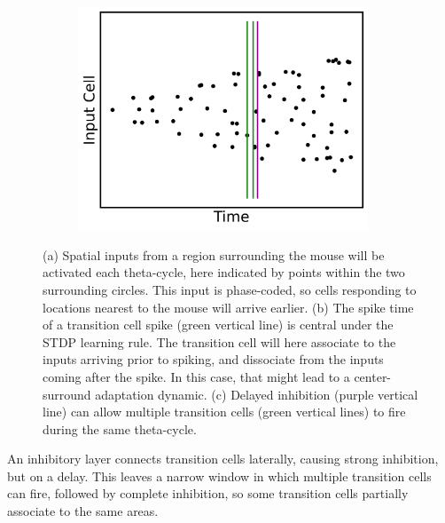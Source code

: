 \documentclass{article}
\begin{document}
\begin{figure}[htbp]
\begin{minipage}[b]{0.38\textwidth}
            \medskip
            
            \begin{subfigure}{\textwidth}
                \subcaption{}
                \includegraphics[width=0.95\textwidth]{input_inhibit_plot.png}
            \end{subfigure}
        \end{minipage}%
        
        \caption{(a) Spatial inputs from a region surrounding the mouse will be activated each theta-cycle, here indicated by points within the two surrounding circles. This input is phase-coded, so cells responding to locations nearest to the mouse will arrive earlier. (b) The spike time of a transition cell spike (green vertical line) is central under the STDP learning rule. The transition cell will here associate to the inputs arriving prior to spiking, and dissociate from the inputs coming after the spike. In this case, that might lead to a center- surround adaptation dynamic. (c) Delayed inhibition (purple vertical line) can allow multiple transition cells (green vertical lines) to fire during the same theta-cycle.}
        
        \label{mouse_plot}
    \end{figure}

    
    An inhibitory layer connects transition cells laterally, causing strong inhibition, but on a delay. This leaves a narrow window in which multiple transition cells can fire, followed by complete inhibition, so some transition cells partially associate to the same areas.
\end{document}

